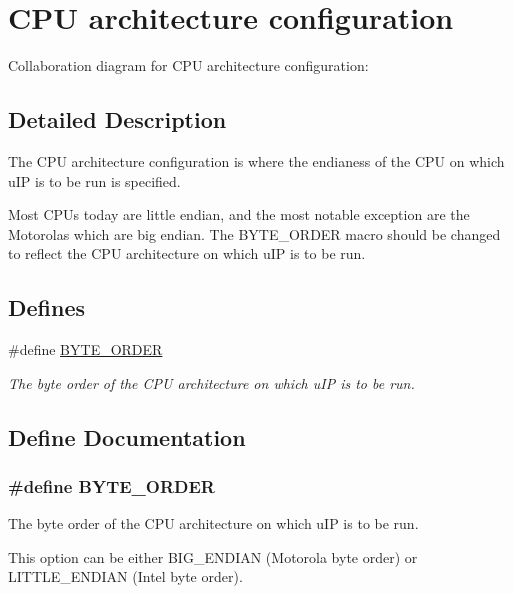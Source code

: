 \hypertarget{a00077}{
\section{CPU architecture configuration}
\label{a00077}
}


Collaboration diagram for CPU architecture configuration:

\subsection{Detailed Description}
The CPU architecture configuration is where the endianess of the CPU on which u\-IP is to be run is specified. 

Most CPUs today are little endian, and the most notable exception are the Motorolas which are big endian. The BYTE\_\-ORDER macro should be changed to reflect the CPU architecture on which u\-IP is to be run. 

\subsection*{Defines}
\begin{CompactItemize}
\item 
\#define \hyperlink{a00077_g1771b7fb65ee640524d0052f229768c3}{BYTE\_\-ORDER}
\begin{CompactList}\small\item\em The byte order of the CPU architecture on which u\-IP is to be run. \item\end{CompactList}\end{CompactItemize}


\subsection{Define Documentation}
\hypertarget{a00077_g1771b7fb65ee640524d0052f229768c3}{
\subsubsection[BYTE\_\-ORDER]{\setlength{\rightskip}{0pt plus 5cm}\#define BYTE\_\-ORDER}}
\label{a00077_g1771b7fb65ee640524d0052f229768c3}


The byte order of the CPU architecture on which u\-IP is to be run. 

This option can be either BIG\_\-ENDIAN (Motorola byte order) or LITTLE\_\-ENDIAN (Intel byte order). 